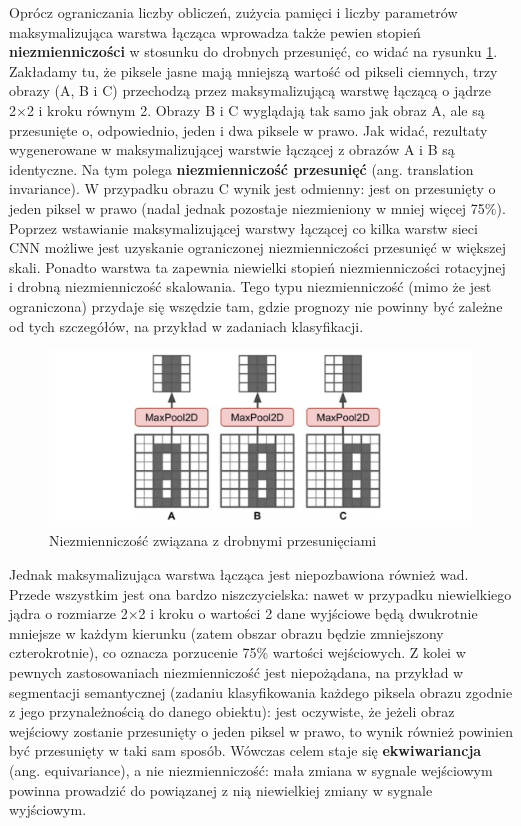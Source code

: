 \documentclass[12pt]{mwbk}
\theoremstyle{plain}
\theoremstyle{definition}
\theoremstyle{remark}
\newcommand\zrodlo[1]{\par\vspace{-3mm}{\small\textit{Źródło: }#1 }}
\begin{document}
Oprócz ograniczania liczby obliczeń, zużycia pamięci i liczby parametrów maksymalizująca warstwa łącząca wprowadza także pewien stopień \textbf{niezmienniczości} w stosunku do drobnych przesunięć, co widać na rysunku \ref{fig:niezmienniczosc-pooling}. Zakładamy tu, że piksele jasne mają mniejszą wartość od pikseli
ciemnych, trzy obrazy (A, B i C) przechodzą przez maksymalizującą warstwę łączącą o jądrze 2×2
i kroku równym 2. Obrazy B i C wyglądają tak samo jak obraz A, ale są przesunięte o, odpowiednio, jeden i dwa piksele w prawo. Jak widać, rezultaty wygenerowane w maksymalizującej warstwie łączącej z obrazów A i B są identyczne. Na tym polega \textbf{niezmienniczość przesunięć} (ang. translation invariance). W przypadku obrazu C wynik jest odmienny: jest on przesunięty o jeden piksel w prawo (nadal jednak pozostaje niezmieniony w mniej więcej 75\%). Poprzez wstawianie maksymalizującej warstwy łączącej co kilka warstw sieci CNN możliwe jest uzyskanie ograniczonej niezmienniczości przesunięć w większej skali. Ponadto warstwa ta zapewnia niewielki stopień niezmienniczości rotacyjnej i drobną niezmienniczość skalowania. Tego typu niezmienniczość (mimo że jest ograniczona) przydaje się wszędzie tam, gdzie prognozy nie powinny być zależne od tych szczegółów, na przykład w zadaniach klasyfikacji.

\begin{figure}[!h]
	\centering
	\includegraphics[width=\linewidth]{rys/niezmienniczosc_pooling.png}
	\caption{Niezmienniczość związana z drobnymi przesunięciami}
	\zrodlo{\cite{geron}}
	\label{fig:niezmienniczosc-pooling}
\end{figure}



Jednak maksymalizująca warstwa łącząca jest niepozbawiona również wad. Przede wszystkim jest
ona bardzo niszczycielska: nawet w przypadku niewielkiego jądra o rozmiarze 2×2 i kroku o wartości 2
dane wyjściowe będą dwukrotnie mniejsze w każdym kierunku (zatem obszar obrazu będzie
zmniejszony czterokrotnie), co oznacza porzucenie 75\% wartości wejściowych. Z kolei w pewnych
zastosowaniach niezmienniczość jest niepożądana, na przykład w segmentacji semantycznej (zadaniu
klasyfikowania każdego piksela obrazu zgodnie z jego przynależnością do danego obiektu): jest oczywiste, że jeżeli obraz wejściowy zostanie przesunięty o jeden piksel w prawo, to wynik również powinien być przesunięty w taki sam sposób. Wówczas celem staje się \textbf{ekwiwariancja} (ang. equivariance), a nie niezmienniczość: mała zmiana w sygnale wejściowym
powinna prowadzić do powiązanej z nią niewielkiej zmiany w sygnale wyjściowym.
\end{document}
